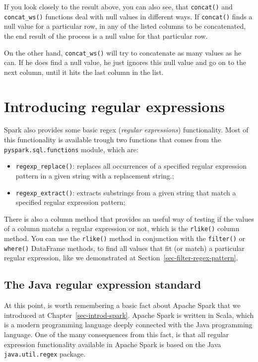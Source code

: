 \documentclass[
  11pt,
  letterpaper,
  DIV=11,
  numbers=noendperiod]{scrreprt}
\providecommand{\tightlist}{%
  \setlength{\itemsep}{0pt}\setlength{\parskip}{0pt}}\usepackage{longtable,booktabs,array}
\begin{document}
If you look closely to the result above, you can also see, that
\texttt{concat()} and \texttt{concat\_ws()} functions deal with null
values in different ways. If \texttt{concat()} finds a null value for a
particular row, in any of the listed columns to be concatenated, the end
result of the process is a null value for that particular row.

On the other hand, \texttt{concat\_ws()} will try to concatenate as many
values as he can. If he does find a null value, he just ignores this
null value and go on to the next column, until it hits the last column
in the list.

\section{Introducing regular expressions}\label{sec-regex}

Spark also provides some basic regex (\emph{regular expressions})
functionality. Most of this functionality is available trough two
functions that comes from the \texttt{pyspark.sql.functions} module,
which are:

\begin{itemize}
\tightlist
\item
  \texttt{regexp\_replace()}: replaces all occurrences of a specified
  regular expression pattern in a given string with a replacement
  string.;
\item
  \texttt{regexp\_extract()}: extracts substrings from a given string
  that match a specified regular expression pattern;
\end{itemize}

There is also a column method that provides an useful way of testing if
the values of a column matchs a regular expression or not, which is the
\texttt{rlike()} column method. You can use the \texttt{rlike()} method
in conjunction with the \texttt{filter()} or \texttt{where()} DataFrame
methods, to find all values that fit (or match) a particular regular
expression, like we demonstrated at
Section~\ref{sec-filter-regex-pattern}.

\subsection{The Java regular expression
standard}\label{the-java-regular-expression-standard}

At this point, is worth remembering a basic fact about Apache Spark that
we introduced at Chapter~\ref{sec-introd-spark}. Apache Spark is written
in Scala, which is a modern programming language deeply connected with
the Java programming language. One of the many consequences from this
fact, is that all regular expression functionality available in Apache
Spark is based on the Java \texttt{java.util.regex} package.
\end{document}
